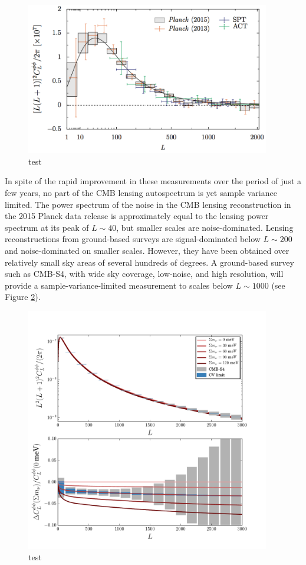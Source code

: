 \begin{figure}[h]
\includegraphics[width=0.95\textwidth]{CMBLensing/CMBLensPower.png}
\caption{test}
\label{CMBLensPower}
\end{figure}

In spite of the rapid improvement in these measurements over the period of just a few years, no part of the CMB lensing autospectrum is yet sample variance limited.  The  power spectrum of the noise in the CMB lensing reconstruction  in the 2015 Planck data release is approximately equal to the lensing power spectrum at its peak of $L \sim 40$, but smaller scales are noise-dominated.  Lensing reconstructions from  ground-based surveys are signal-dominated below $L \sim 200$ and noise-dominated on smaller scales.  However, they have been obtained over relatively small sky areas of several hundreds of degrees. A ground-based survey such as CMB-S4, with wide sky coverage, low-noise, and high resolution, will provide a sample-variance-limited measurement to scales below $L \sim 1000$ (see Figure \ref{Neutrinos}).  
 


\begin{figure}[h]
\includegraphics[width=0.95\textwidth]{CMBLensing/s4errors.pdf}
\caption{test}
\label{Neutrinos}
\end{figure}

